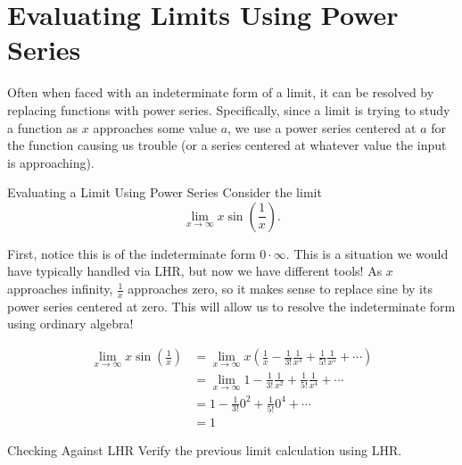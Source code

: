 
\section{Evaluating Limits Using Power Series}\label{EvalLHR}

Often when faced with an indeterminate form of a limit, it can be resolved by replacing functions with power series.  Specifically, since a limit is trying to study a function as $x$ approaches some value $a$, we use a power series centered at $a$ for the function causing us trouble (or a series centered at whatever value the input is approaching). 

\begin{example}{Evaluating a Limit Using Power Series}
Consider the limit $$\lim_{x \rightarrow \infty} x\sin\left(\frac{1}{x}\right). $$

First, notice this is of the indeterminate form $0\cdot \infty$.  This is a situation we would have typically handled via LHR, but now we have different tools!  As $x$ approaches infinity, $\frac{1}{x}$ approaches zero, so it makes sense to replace sine by its power series centered at zero.  This will allow us to resolve the indeterminate form using ordinary algebra! 

\begin{align*}
\lim_{x \rightarrow \infty} x\sin\left(\frac{1}{x}\right) &=\lim_{x \rightarrow \infty} x\left(\frac{1}{x}-\frac{1}{3!}\frac{1}{x^3}+\frac{1}{5!}\frac{1}{x^5}+\cdots\right) \\
&=\lim_{x \rightarrow \infty} 1-\frac{1}{3!}\frac{1}{x^2}+\frac{1}{5!}\frac{1}{x^4}+\cdots \\
&= 1-\frac{1}{3!}0^2+\frac{1}{5!}0^4+\cdots \\
&=1
\end{align*}
\end{example}

\begin{exercise}{Checking Against LHR \Coffeecup \Coffeecup}
Verify the previous limit calculation using LHR. \vspace*{1in}
\end{exercise}

